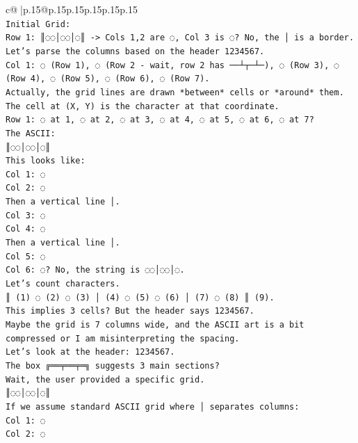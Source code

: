 \documentclass{article}
\begin{document}
{\begin{supertabular}{c@{$\;$}|p{.15\linewidth}@{}p{.15\linewidth}p{.15\linewidth}p{.15\linewidth}p{.15\linewidth}p{.15\linewidth}}
{{{\\ 
\texttt{Initial Grid:} \\
\texttt{Row 1: ║◌◌│◌◌│◌║ {-}> Cols 1,2 are ◌, Col 3 is ◌? No, the │ is a border.} \\
\texttt{Let's parse the columns based on the header 1234567.} \\
\texttt{Col 1: ◌ (Row 1), ◌ (Row 2 {-} wait, row 2 has ──┴┬─┴─), ◌ (Row 3), ◌ (Row 4), ◌ (Row 5), ◌ (Row 6), ◌ (Row 7).} \\
\texttt{Actually, the grid lines are drawn *between* cells or *around* them.} \\
\texttt{The cell at (X, Y) is the character at that coordinate.} \\
\texttt{Row 1: ◌ at 1, ◌ at 2, ◌ at 3, ◌ at 4, ◌ at 5, ◌ at 6, ◌ at 7?} \\
\texttt{The ASCII:} \\
\texttt{║◌◌│◌◌│◌║} \\
\texttt{This looks like:} \\
\texttt{Col 1: ◌} \\
\texttt{Col 2: ◌} \\
\texttt{Then a vertical line │.} \\
\texttt{Col 3: ◌} \\
\texttt{Col 4: ◌} \\
\texttt{Then a vertical line │.} \\
\texttt{Col 5: ◌} \\
\texttt{Col 6: ◌? No, the string is ◌◌│◌◌│◌.} \\
\texttt{Let's count characters.} \\
\texttt{║ (1) ◌ (2) ◌ (3) │ (4) ◌ (5) ◌ (6) │ (7) ◌ (8) ║ (9).} \\
\texttt{This implies 3 cells? But the header says 1234567.} \\
\texttt{Maybe the grid is 7 columns wide, and the ASCII art is a bit compressed or I am misinterpreting the spacing.} \\
\texttt{Let's look at the header:  1234567.} \\
\texttt{The box ╔══╤══╤═╗ suggests 3 main sections?} \\
\texttt{Wait, the user provided a specific grid.} \\
\texttt{║◌◌│◌◌│◌║} \\
\texttt{If we assume standard ASCII grid where │ separates columns:} \\
\texttt{Col 1: ◌} \\
\texttt{Col 2: ◌} \\
}}}
\end{supertabular}}
\end{document}
